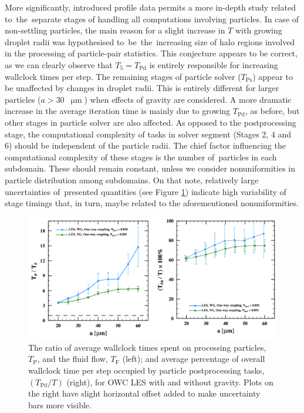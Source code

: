 \documentclass{pracamgren}
\begin{document}
More significantly, introduced profile data permits a more in-depth study related to~the~separate stages of handling all computations involving particles.
In case of non-settling particles, the main reason for a slight increase in $T$ with growing droplet radii was hypothesised to~be~the~increasing size of halo regions involved in the processing of particle-pair statistics.
This conjecture appears to be correct, as we can clearly observe that $T_5 = T_{\text{Pd}}$ is entirely responsible for increasing wallclock times per step.
The remaining stages of particle solver ($T_{\text{Ps}}$) appear to be unaffected by changes in droplet radii.
This is entirely different for larger particles ($a > 30$~$\upmu\text{m}$) when effects of gravity are considered.
A more dramatic increase in the average iteration time is mainly due to growing $T_{\text{Pd}}$, as before, but other stages in particle solver are also affected.
As opposed to the postprocessing stage, the computational complexity of tasks in solver segment (Stages 2, 4 and 6) should be independent of the particle radii.
The chief factor influencing the computational complexity of these stages is the number of~particles in each subdomain.
These should remain constant, unless we consider nonuniformities in particle distribution among subdomains.
On that note, relatively large uncertainties of~presented quantities (see Figure \ref{fig:pffowclesex}) indicate high variability of stage timings that, in turn, maybe related to the aforementioned nonuniformities.

\begin{figure}[h]
\centering
\includegraphics[width=13.5cm]{img/plots/3-3b-pffowclesex.pdf}
\caption{
The ratio of average wallclock times spent on processing particles, $T_{\text{P}}$, and the fluid flow, $T_{\text{F}}$ (left); and average percentage of overall wallclock time per step occupied by particle postprocessing tasks, $(T_{\text{Pd}} / T)$ (right), for OWC LES with and without gravity.
Plots on the right have slight horizontal offset added to make uncertainty bars more visible.
}
\label{fig:pffowclesex}
\end{figure}
\end{document}
